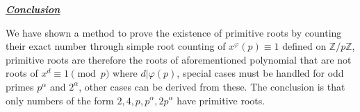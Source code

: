 \documentclass[aps,preprint,preprintnumbers,nofootinbib,showpacs,prd]{revtex4-1}
\begin{document}
\bigskip
\underline{\textbf{\textit{Conclusion}}}
\bigskip

We have shown a method to prove the existence of primitive roots by counting their exact number through simple root counting of $x^\varphi(p) \equiv 1$ defined on $\mathbb{Z}/p\mathbb{Z}$, primitive roots are therefore the roots of aforementioned polynomial that are not roots of $x^d \equiv 1 \pmod{p}$ where $d|\varphi(p)$, special cases must be handled for odd primes $p^\alpha$ and $2^\alpha$, other cases can be derived from these. The conclusion is that only numbers of the form $2, 4, p, p^\alpha, 2p^\alpha$ have primitive roots.
\end{document}
